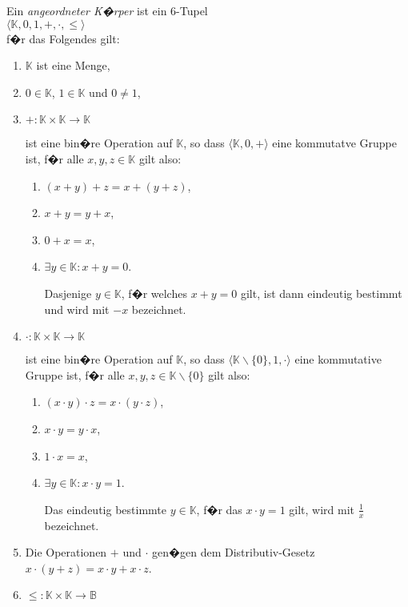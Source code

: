\begin{Definition}
  Ein \emph{angeordneter K�rper} ist ein 6-Tupel 
  \\[0.2cm]
  \hspace*{1.3cm}
  $\langle \mathbb{K}, 0, 1, +, \cdot, \leq \rangle$
  \\[0.2cm]
  f�r das Folgendes gilt:
  \begin{enumerate}
  \item $\mathbb{K}$ ist eine Menge, 
  \item $0 \in \mathbb{K}$, $1 \in \mathbb{K}$ und $0 \not= 1$,
  \item $+: \mathbb{K} \times \mathbb{K} \rightarrow \mathbb{K}$

        ist eine bin�re Operation auf $\mathbb{K}$, so dass $\langle \mathbb{K}, 0, + \rangle$
        eine kommutatve Gruppe ist, f�r alle $x,y,z \in \mathbb{K}$ gilt also:
        \begin{enumerate}
        \item $(x + y) + z = x + (y + z)$,
        \item $x + y = y + x$,
        \item $0 + x = x$,
        \item $\exists y \in \mathbb{K}: x + y = 0$.

              Dasjenige $y \in \mathbb{K}$, f�r welches $x + y = 0$ gilt, ist dann eindeutig bestimmt und wird mit
              $-x$ bezeichnet.
        \end{enumerate}
  \item $\cdot: \mathbb{K} \times \mathbb{K} \rightarrow \mathbb{K}$

        ist eine bin�re Operation auf $\mathbb{K}$, so dass $\langle \mathbb{K}\backslash\{0\}, 1, \cdot \rangle$
        eine kommutative Gruppe ist, f�r alle $x,y,z \in \mathbb{K} \backslash\{0\}$ gilt also:
        \begin{enumerate}
        \item $(x \cdot y) \cdot z = x \cdot (y \cdot z)$,
        \item $x \cdot y = y \cdot x$,
        \item $1 \cdot x = x$,
        \item $\exists y \in \mathbb{K}: x \cdot y = 1$.

              Das eindeutig bestimmte $y \in \mathbb{K}$, f�r das $x \cdot y = 1$ gilt, wird mit $\frac{1}{x}$ bezeichnet.
        \end{enumerate}
  \item Die Operationen $+$ und $\cdot$ gen�gen dem Distributiv-Gesetz
        \\[0.2cm]
        \hspace*{1.3cm}
        $x \cdot (y + z) = x \cdot y + x \cdot z$.
  \item $\leq: \mathbb{K} \times \mathbb{K} \rightarrow \mathbb{B}$
    

\end{enumerate}
\end{Definition}
